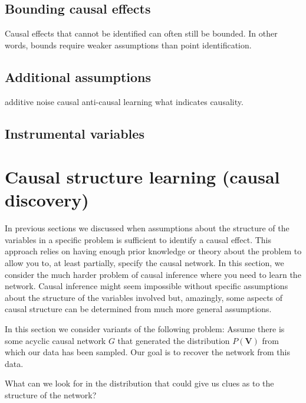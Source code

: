 \documentclass[11pt,a4paper]{article}
\begin{document}
\subsection{Bounding causal effects}
Causal effects that cannot be identified can often still be bounded. In other words, bounds require weaker assumptions than point identification.
 
\subsection{Additional assumptions}
additive noise
causal anti-causal \cite{Janzing2012}
learning what indicates causality. 

\subsection{Instrumental variables}



\section{Causal structure learning (causal discovery)}
\label{sec:causaldiscovery}

In previous sections we discussed when assumptions about the structure of the variables in a specific problem is sufficient to identify a causal effect. This approach relies on having enough prior knowledge or theory about the problem to allow you to, at least partially, specify the causal network. In this section, we consider the much harder problem of causal inference where you need to learn the network. Causal inference might seem impossible without specific assumptions about the structure of the variables involved but, amazingly, some aspects of causal structure can be determined from much more general assumptions.  

In this section we consider variants of the following problem: Assume there is some acyclic causal network $G$ that generated the distribution $P(\boldsymbol{V})$ from which our data has been sampled. Our goal is to recover the network from this data. 

What can we look for in the distribution that could give us clues as to the structure of the network? 
\end{document}
